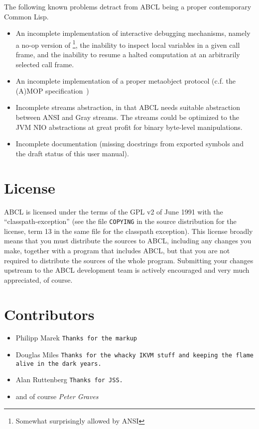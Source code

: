 \documentclass[10pt]{book}
\begin{document}
The following known problems detract from \textsc{ABCL} being a proper
contemporary Common Lisp.
\begin{itemize}
\item An incomplete implementation of interactive debugging mechanisms,
  namely a no-op version of  \footnote{Somewhat surprisingly
    allowed by \textsc{ANSI}}, the inability to inspect local variables
  in a given call frame, and the inability to resume a halted
  computation at an arbitrarily selected call frame.
\item An incomplete implementation of a proper metaobject protocol
  (c.f. the (A)MOP specification~\cite{AMOP, AMOPspec})
\item Incomplete streams abstraction, in that \textsc{ABCL} needs
  suitable abstraction between ANSI and Gray streams.  The streams could
  be optimized to the JVM NIO abstractions at great profit for binary
  byte-level manipulations.
\item Incomplete documentation (missing docstrings from exported symbols
  and the draft status of this user manual).
\end{itemize}



\section{License}

ABCL is licensed under the terms of the GPL v2 of June 1991 with the
``classpath-exception'' (see the file \texttt{COPYING} in the source
distribution for the license, term 13 in the same file for the classpath
exception).  This license broadly means that you must distribute the
sources to ABCL, including any changes you make, together with a program
that includes ABCL, but that you are not required to distribute the
sources of the whole program.  Submitting your changes upstream to the
ABCL development team is actively encouraged and very much appreciated,
of course.

\section{Contributors}

\begin{itemize}
\item Philipp Marek \texttt{Thanks for the markup}
\item Douglas Miles \texttt{Thanks for the whacky IKVM stuff and keeping the flame alive
  in the dark years.}
\item Alan Ruttenberg \texttt{Thanks for JSS.}
\item and of course
\emph{Peter Graves}
\end{itemize}
\end{document}
